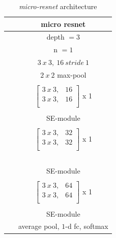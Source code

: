 \documentclass[../document.tex]{subfiles}
\begin{document}
\begin{table}[H]
    \centering
    \begin{tabular}{|lc|}
        \hline
        & micro resnet \\
        \hline 
        & depth $=3$ \\ 
        \hline 
        & n $=1$ \\
        \hline
     &$3 \ x\ 3,\ 16 \ stride\ 1$ \\ 
     \hline
     &$2 \ x\ 2$ max-pool \\ 
     \hline
     & \\
     &$\begin{bmatrix}
      3\ x\ 3, & 16 \\
      3\ x \ 3, & 16 \\  
     \end{bmatrix}$ x 1 \\ 
     & \\
     \hline     
     & SE-module\\ 
     \hline     
     & \\
     &$\begin{bmatrix}
        3\ x \ 3, & 32 \\
        3\ x\ 3, & 32 \\  
       \end{bmatrix}$ x 1 \\\
       & \\ 
       \hline
       & SE-module\\ 
       \hline
       & \\
       &$\begin{bmatrix}
        3\ x \ 3, & 64 \\
        3 \ x \ 3, & 64 \\  
       \end{bmatrix}$ x 1 \\  
       & \\
       \hline     
       & SE-module\\ 
       \hline
       & average pool, $1$-d fc, softmax \\ 
       \hline

    \end{tabular}
    \caption{\emph{micro-resnet} architecture}
\end{table}

\end{document}
